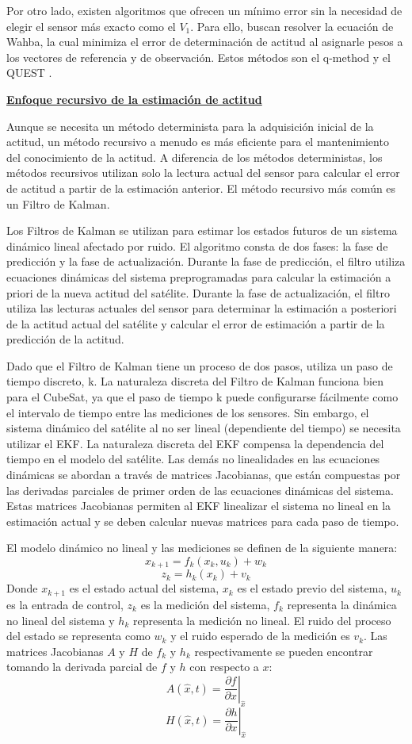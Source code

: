 Por otro lado, existen algoritmos que ofrecen un mínimo error sin la necesidad de elegir el sensor más exacto como el $V_1$. Para ello, buscan resolver la ecuación de Wahba, la cual minimiza el error de determinación de actitud al asignarle pesos a los vectores de referencia y de observación. Estos métodos son el q-method y el QUEST \cite{ref15}.

\textbf{\underline{Enfoque recursivo de la estimación de actitud}}

Aunque se necesita un método determinista para la adquisición inicial de la actitud, un método recursivo a menudo es más eficiente para el mantenimiento del conocimiento de la actitud. A diferencia de los métodos deterministas, los métodos recursivos utilizan solo la lectura actual del sensor para calcular el error de actitud a partir de la estimación anterior. El método recursivo más común es un Filtro de Kalman.

Los Filtros de Kalman se utilizan para estimar los estados futuros de un sistema dinámico lineal afectado por ruido. El algoritmo consta de dos fases: la fase de predicción y la fase de actualización. Durante la fase de predicción, el filtro utiliza ecuaciones dinámicas del sistema preprogramadas para calcular la estimación a priori de la nueva actitud del satélite. Durante la fase de actualización, el filtro utiliza las lecturas actuales del sensor para determinar la estimación a posteriori de la actitud actual del satélite y calcular el error de estimación a partir de la predicción de la actitud.

Dado que el Filtro de Kalman tiene un proceso de dos pasos, utiliza un paso de tiempo discreto, k. La naturaleza discreta del Filtro de Kalman funciona bien para el CubeSat, ya que el paso de tiempo k puede configurarse fácilmente como el intervalo de tiempo entre las mediciones de los sensores. Sin embargo, el sistema dinámico del satélite al no ser lineal (dependiente del tiempo) se necesita utilizar el \gls{EKF}. La naturaleza discreta del \gls{EKF} compensa la dependencia del tiempo en el modelo del satélite. Las demás no linealidades en las ecuaciones dinámicas se abordan a través de matrices Jacobianas, que están compuestas por las derivadas parciales de primer orden de las ecuaciones dinámicas del sistema. Estas matrices Jacobianas permiten al \gls{EKF} linealizar el sistema no lineal en la estimación actual y se deben calcular nuevas matrices para cada paso de tiempo.

El modelo dinámico no lineal y las mediciones se definen de la siguiente manera:
\[
x_{k+1} = f_k(x_k, u_k) + w_k
\]
\[
z_k = h_k(x_k) + v_k
\]
Donde $x_{k+1}$ es el estado actual del sistema, $x_k$ es el estado previo del sistema, $u_k$ es la entrada de control, $z_k$ es la medición del sistema, $f_k$ representa la dinámica no lineal del sistema y $h_k$ representa la medición no lineal. El ruido del proceso del estado se representa como $w_k$ y el ruido esperado de la medición es $v_k$. Las matrices Jacobianas $A$ y $H$ de $f_k$ y $h_k$ respectivamente se pueden encontrar tomando la derivada parcial de $f$ y $h$ con respecto a $x$:
\[
A(\hat{x}, t) = \left. \frac{\partial f}{\partial x} \right|_{\hat{x}} 
\]
\[
H(\hat{x}, t) = \left. \frac{\partial h}{\partial x} \right|_{\hat{x}} 
\]

